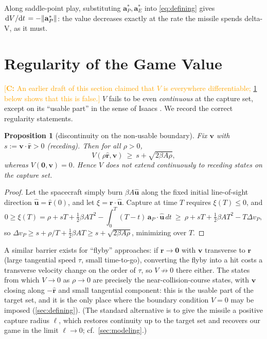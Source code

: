 \documentclass{article}
\newcommand{\authnote}[3]{\textcolor{#3}{[{\footnotesize {\bf #1:} { {#2}}}]}}
\newcommand{\cnote}[1]{\authnote{C}{#1}{orange} }
\newcommand{\eqdef}{:=}
\renewcommand{\vec}[1]{\mathbf{#1}}
\newtheorem{proposition}[theorem]{Proposition}
\theoremstyle{remark}
\begin{document}
Along saddle-point play, substituting $\vec a_P^*, \vec a_E^*$ into
\cref{eq:defining} gives
$\dv*{V}{t} = -\norm{\vec a_P^*}$: the value decreases exactly at the rate the
missile spends delta-V, as it must.

\section{Regularity of the Game Value}
\label{sec:regularity}

\cnote{An earlier draft of this section claimed that $V$ is everywhere
  differentiable; \cref{prop:discont} below shows that this is false.}
$V$ fails to be even \emph{continuous} at the capture set, except on its
``usable part'' in the sense of Isaacs \cite{isaacs1965}.  We record the
correct regularity statements.

\begin{proposition}[discontinuity on the non-usable boundary]
  \label{prop:discont}
  Fix $\vec v$ with $s \eqdef \vec v \cdot \hat{\vec r} > 0$ (receding).  Then
  for all $\rho > 0$,
  \[
    V(\rho \hat{\vec r}, \vec v) \ \ge\ s + \sqrt{2 \beta A \rho} ,
  \]
  whereas $V(\vec 0, \vec v) = 0$.  Hence $V$ does not extend continuously to
  receding states on the capture set.
\end{proposition}

\begin{proof}
  Let the spacecraft simply burn $\beta A \hat{\vec u}$ along the fixed initial
  line-of-sight direction $\hat{\vec u} = \hat{\vec r}(0)$, and let
  $\xi = \vec r \cdot \hat{\vec u}$.  Capture at time $T$ requires $\xi(T) \le 0$,
  and
  \[
    0 \ge \xi(T) = \rho + s T + \tfrac{1}{2}\beta A T^2
    - \int_0^T (T - t)\, \vec a_P \cdot \hat{\vec u} \, dt
    \ \ge\ \rho + s T + \tfrac{1}{2}\beta A T^2 - T \Delta v_P ,
  \]
  so $\Delta v_P \ge s + \rho/T + \tfrac{1}{2}\beta A T \ge s + \sqrt{2\beta
    A \rho}$, minimizing over $T$.
\end{proof}

A similar barrier exists for ``flyby'' approaches: if $\vec r \to \vec 0$ with
$\vec v$ transverse to $\vec r$ (large tangential speed $\tau$, small
time-to-go), converting the flyby into a hit costs a transverse velocity
change on the order of $\tau$, so $V \not\to 0$ there either.  The states from
which $V \to 0$ as $\rho \to 0$ are precisely the near-collision-course
states, with $\vec v$ closing along $-\hat{\vec r}$ and small tangential
component: this is the usable part of the target set, and it is the only place
where the boundary condition $V = 0$ may be imposed
(\cref{sec:defining}).  (The standard alternative is to give the missile a
positive capture radius $\ell$, which restores continuity up to the target set
and recovers our game in the limit $\ell \to 0$; cf.\ \cref{sec:modeling}.)
\end{document}
